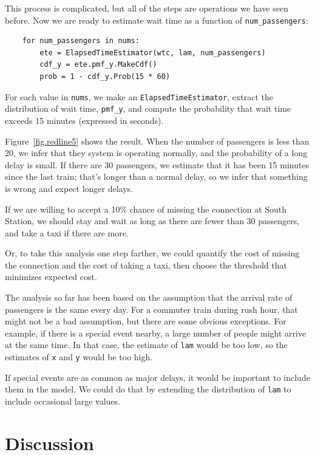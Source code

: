 \documentclass[12pt]{book}
\begin{document}
This process is complicated, but
all of the steps are operations we have seen before.
Now we are ready to estimate wait time as a function of
\verb"num_passengers":

\begin{verbatim}
    for num_passengers in nums:
        ete = ElapsedTimeEstimator(wtc, lam, num_passengers)
        cdf_y = ete.pmf_y.MakeCdf()
        prob = 1 - cdf_y.Prob(15 * 60)
\end{verbatim}

For each value in {\tt nums}, we make an {\tt ElapsedTimeEstimator},
extract the distribution of wait time, \verb"pmf_y", and compute
the probability that wait time exceeds 15 minutes (expressed in seconds).

Figure~\ref{fig.redline5} shows the result.  When the number of
passengers is less than 20, we infer that they system is
operating normally, and the probability of a long delay is small.
If there are 30 passengers, we estimate that it has been 15
minutes since the last train; that's longer than a normal delay,
so we infer that something is wrong and expect longer delays.

If we are willing to accept a 10\% chance of missing the connection
at South Station, we should stay and wait as long as there
are fewer than 30 passengers, and take a taxi if there are more.

Or, to take this analysis one step farther, we could quantify the cost
of missing the connection and the cost of taking a taxi, then choose
the threshold that minimizes expected cost.

The analysis so far has been based on the assumption that the
arrival rate of passengers is the same every day.  For a commuter
train during rush hour, that might not be a bad assumption, but
there are some obvious exceptions.  For example, if there is a special
event nearby, a large number of people might arrive at the same time.
In that case, the estimate of {\tt lam} would be too low, so the
estimates of {\tt x} and {\tt y} would be too high.

If special events are as common as major delays, it would
be important to include them in the model.  We could do that by
extending the distribution of {\tt lam} to include occasional
large values.


\section{Discussion}
\end{document}
